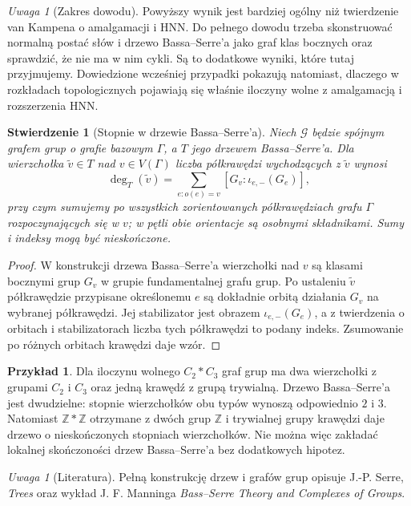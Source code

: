 \documentclass[11pt,a4paper]{report}
\numberwithin{equation}{section}
\theoremstyle{plain}
\newtheorem{stwierdzenie}[twierdzenie]{Stwierdzenie}
\theoremstyle{definition}
\newtheorem{przyklad}[twierdzenie]{Przykład}
\theoremstyle{remark}
\newtheorem{uwaga}[twierdzenie]{Uwaga}
\begin{document}
\begin{uwaga}[Zakres dowodu]
Powyższy wynik jest bardziej ogólny niż twierdzenie van
Kampena o amalgamacji i HNN. Do pełnego dowodu trzeba
skonstruować normalną postać słów i drzewo Bassa--Serre'a
jako graf klas bocznych oraz sprawdzić, że nie ma w nim
cykli. Są to dodatkowe wyniki, które tutaj przyjmujemy.
Dowiedzione wcześniej przypadki pokazują natomiast,
dlaczego w rozkładach topologicznych pojawiają się właśnie
iloczyny wolne z amalgamacją i rozszerzenia HNN.
\end{uwaga}

\begin{stwierdzenie}[Stopnie w drzewie Bassa--Serre'a]
Niech $\mathcal G$ będzie spójnym grafem grup o grafie bazowym
$\Gamma$, a $T$ jego drzewem Bassa--Serre'a. Dla
wierzchołka $\widetilde v\in T$ nad $v\in V(\Gamma)$
liczba półkrawędzi wychodzących z $\widetilde v$ wynosi
\[
\deg_T(\widetilde v)=
\sum_{e\colon o(e)=v}[G_v:\iota_{e,-}(G_e)],
\]
przy czym sumujemy po wszystkich zorientowanych
półkrawędziach grafu $\Gamma$ rozpoczynających się w $v$;
w pętli obie orientacje są osobnymi składnikami.
Sumy i indeksy mogą być nieskończone.
\end{stwierdzenie}
\begin{proof}
W konstrukcji drzewa Bassa--Serre'a wierzchołki nad $v$
są klasami bocznymi grup $G_v$ w grupie fundamentalnej
grafu grup. Po ustaleniu $\widetilde v$ półkrawędzie
przypisane określonemu $e$ są dokładnie orbitą działania
$G_v$ na wybranej półkrawędzi. Jej stabilizator jest
obrazem $\iota_{e,-}(G_e)$, a z twierdzenia o orbitach
i stabilizatorach liczba tych półkrawędzi to podany indeks.
Zsumowanie po różnych orbitach krawędzi daje wzór.
\end{proof}
\begin{przyklad}
Dla iloczynu wolnego $C_2*C_3$ graf grup ma dwa wierzchołki
z grupami $C_2$ i $C_3$ oraz jedną krawędź z grupą trywialną.
Drzewo Bassa--Serre'a jest dwudzielne: stopnie wierzchołków
obu typów wynoszą odpowiednio $2$ i $3$. Natomiast
$\mathbb Z*\mathbb Z$ otrzymane z dwóch grup $\mathbb Z$
i trywialnej grupy krawędzi daje drzewo o nieskończonych
stopniach wierzchołków. Nie można więc zakładać lokalnej
skończoności drzew Bassa--Serre'a bez dodatkowych hipotez.
\end{przyklad}

\begin{uwaga}[Literatura]
Pełną konstrukcję drzew i grafów grup opisuje J.-P. Serre,
\emph{Trees} oraz wykład J. F. Manninga
\emph{Bass--Serre Theory and Complexes of Groups}.
\end{uwaga}
\end{document}
